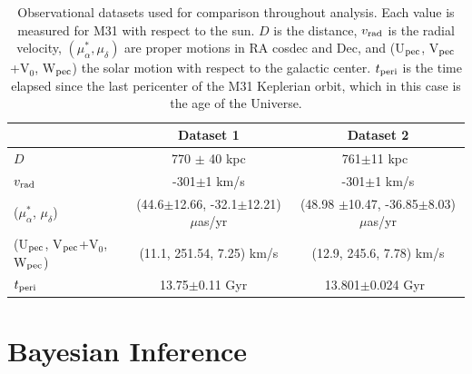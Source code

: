 \documentclass[twocolumn]{aastex631}
\begin{document}
\begin{table}
  \centering
  \begin{tabular}{lc|c}
    \hline\hline
                    & Dataset 1                     & Dataset 2 \\\hline
  $D$               &  770 $\pm$ 40 \rm kpc\cite{}     &   761$\pm$11 \rm kpc~\citep{Li2021}        \\
  $v_{\rm rad}$     &     -301$\pm$1 km/s       &   -301$\pm$1 km/s        \\
  ($\mu_\alpha^*$,  $\mu_\delta$)    & (44.6$\pm$12.66, -32.1$\pm$12.21) $\mu$as/yr \citep{} & (48.98 $\pm$10.47, -36.85$\pm$8.03) $\mu$as/yr \citep{Salomon2021}\\
  (U$_{\rm pec}$, V$_{\rm pec}$+V$_0$, W$_{\rm pec}$) & (11.1, 251.54, 7.25) km/s& (12.9, 245.6, 7.78) km/s \citep{Drimmel2018}\\
  $t_{\rm peri}$ & 13.75$\pm$0.11 Gyr ~\citep{Jarosik2011} & 13.801$\pm$0.024 Gyr~\citep{??}\\
  \hline\hline

  \end{tabular}
  \caption{\label{table:data}Observational datasets used for comparison throughout analysis. Each value is measured for M31 with respect to the sun. $D$ is the distance, $v_{\rm rad}$ is the radial velocity, $(\mu^*_{\alpha}, \mu_{\delta})$ are proper motions in RA cosdec and Dec, and (U$_{\rm pec}$, V$_{\rm pec}$+V$_0$, W$_{\rm pec}$) the solar motion with respect to the galactic center. $t_{\rm peri}$ is the time elapsed since the last pericenter of the M31 Keplerian orbit, which in this case is the age of the Universe. }
\end{table}


\section{Bayesian Inference}
\label{sec:bayes}
\end{document}
